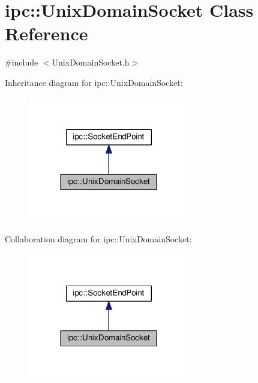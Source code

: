 \hypertarget{classipc_1_1UnixDomainSocket}{}\section{ipc\+:\+:Unix\+Domain\+Socket Class Reference}
\label{classipc_1_1UnixDomainSocket}


{\ttfamily \#include $<$Unix\+Domain\+Socket.\+h$>$}



Inheritance diagram for ipc\+:\+:Unix\+Domain\+Socket\+:
\nopagebreak
\begin{figure}[H]
\begin{center}
\leavevmode
\includegraphics[width=200pt]{classipc_1_1UnixDomainSocket__inherit__graph}
\end{center}
\end{figure}


Collaboration diagram for ipc\+:\+:Unix\+Domain\+Socket\+:
\nopagebreak
\begin{figure}[H]
\begin{center}
\leavevmode
\includegraphics[width=200pt]{classipc_1_1UnixDomainSocket__coll__graph}
\end{center}
\end{figure}
